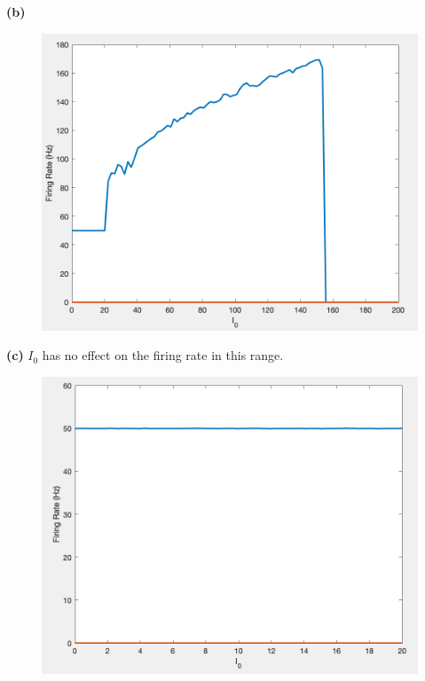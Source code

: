 \documentclass[]{article}
\begin{document}
\textbf{(b)}
\begin{figure}
    \centering
    \includegraphics[scale=0.5]{i0_firing_curve.png}
    \label{fig:i0_curve}
\end{figure}

\textbf{(c)} $I_0$ has no effect on the firing rate in this range.
\begin{figure}
    \centering
    \includegraphics[scale=0.5]{i0_range.png}
    \label{fig:i0_range}
\end{figure}
\end{document}
